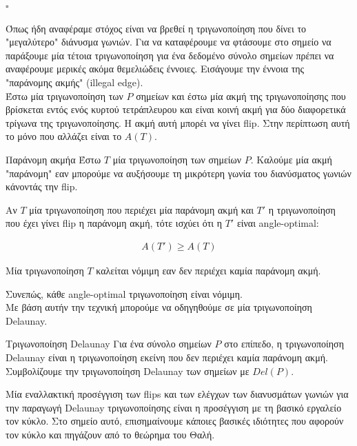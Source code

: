 \documentclass[oneside,12pt]{book}
\theoremstyle{definition}
\begin{document}
\(\square \)

Όπως ήδη αναφέραμε στόχος είναι να βρεθεί η τριγωνοποίηση που δίνει το "μεγαλύτερο" διάνυσμα γωνιών. Για να καταφέρουμε να φτάσουμε στο σημείο να παράξουμε μία τέτοια τριγωνοποίηση για ένα δεδομένο σύνολο σημείων πρέπει να αναφέρουμε μερικές ακόμα θεμελιώδεις έννοιες. Εισάγουμε την έννοια της "παράνομης ακμής" (illegal edge). \\

Έστω μία τριγωνοποίηση των \(P\) σημείων και έστω μία ακμή της τριγωνοποίησης που βρίσκεται εντός ενός κυρτού τετράπλευρου και είναι κοινή ακμή για δύο διαφορετικά τρίγωνα της τριγωνοποίησης. Η ακμή αυτή μπορέι να γίνει flip. Στην περίπτωση αυτή το μόνο που αλλάζει είναι το \(A(T)\). \\

\begin{mydefinition}{Παράνομη ακμή}{α}
	Έστω \(T\) μία τριγωνοποίηση των σημείων \(P\).  Καλούμε μία ακμή "παράνομη" εαν μπορούμε να αυξήσουμε τη μικρότερη γωνία του διανύσματος γωνιών κάνοντάς την flip.
\end{mydefinition}

Αν \(T\) μία τριγωνοποίηση που περιέχει μία παράνομη ακμή και \(T'\) η τριγωνοποίηση που έχει γίνει flip η παράνομη ακμή, τότε ισχύει ότι η \(T'\) είναι angle-optimal:

\begin{align*}
	A(T') \geq A(T)
\end{align*}

\begin{mydefinition}{}{}
	Μία τριγωνοποίηση \(T\) καλείται νόμιμη εαν δεν περιέχει καμία παράνομη ακμή.
\end{mydefinition}

Συνεπώς, κάθε angle-optimal τριγωνοποίηση είναι νόμιμη. \\

Με βάση αυτήν την τεχνική μπορούμε να οδηγηθούμε σε μία τριγωνοποίηση Delaunay. \\

\begin{mydefinition}{Τριγωνοποίηση Delaunay}{}
	Για ένα σύνολο σημείων \(P\) στο επίπεδο, η τριγωνοποίηση Delaunay είναι η τριγωνοποίηση εκείνη που δεν περιέχει καμία παράνομη ακμή. Συμβολίζουμε την τριγωνοποίηση Delaunay των σημείων με \(Del(P)\).
\end{mydefinition}

Μία εναλλακτική προσέγγιση των flips και των ελέγχων των διανυσμάτων γωνιών για την παραγωγή Delaunay τριγωνοποίησης είναι η προσέγγιση με τη βασικό εργαλείο τον κύκλο. Στο σημείο αυτό, επισημαίνουμε κάποιες βασικές ιδιότητες που αφορούν τον κύκλο και πηγάζουν από το θεώρημα του Θαλή. \\
\end{document}
